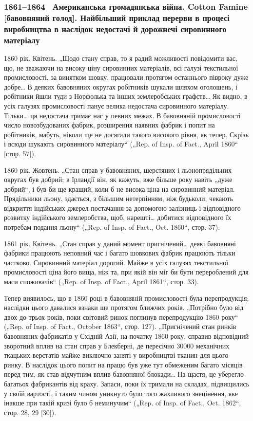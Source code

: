 
\subsubsection{1861--1864~ Американська громадянська війна. Cotton Famine [бавовняний
голод]. Найбільший приклад перерви в процесі виробництва в наслідок
недостачі й дорожнечі сировинного матеріалу}

1860 рік. Квітень. „Щодо стану справ, то я радий можливості
повідомити вас, що, не зважаючи на високу ціну сировинних
матеріалів, всі галузі текстильної промисловості, за винятком
шовку, працювали протягом останнього півроку дуже добре\dots{}
В деяких бавовняних округах робітників шукали шляхом оголошень,
і робітники йшли туди з Норфолька та інших землеробських
графств\dots{} Як видно, в усіх галузях промисловості панує велика недостача
сировинного матеріалу. Тільки\dots{} ця недостача тримає нас
у певних межах. В бавовняній промисловості число новозбудованих
фабрик, розширення наявних фабрик і попит на робітників,
мабуть, ніколи ще не досягали такого високого рівня, як
тепер. Скрізь і всюди шукають сировинного матеріалу“ („Rep.
of Insp. of Fact., April 1860“ [стор. 57]).

1860 рік. Жовтень. „Стан справ у бавовняних, шерстяних
і льонопрядільних округах був добрий; в Ірландії він, як кажуть,
вже більше року навіть „дуже добрий“, і був би ще кращий,
коли б не висока ціна на сировинний матеріал. Прядільники
льону, здається, з більшим нетерпінням, ніж будьколи,
чекають відкриття індійських джерел постачання за допомогою
залізниць і відповідного розвитку індійського землеробства, щоб,
нарешті\dots{} добитися відповідного їх потребам подання льону“
(„Rep. of Insp. of Fact., Oct. 1860“, стор. 37).

1861 рік. Квітень. „Стан справ у даний момент пригнічений\dots{}
деякі бавовняні фабрики працюють неповний час і багато шовкових
фабрик працюють тільки частково. Сировинний матеріал
дорогий. Майже в усіх галузях текстильної промисловості
ціна його вища, ніж та, при якій він міг би бути перероблений
для маси споживачів“ („Rep. of Insp. of Fact., April 1861“, стор. 33).

Тепер виявилось, що в 1860 році в бавовняній промисловості
була перепродукція; наслідки цього давалися взнаки ще протягом
ближчих років. „Потрібно було від двох до трьох років,
поки світовий ринок поглинув перепродукцію 1860 року“ („Rep.
of Insp. of Fact., October 1863“, стор. 127). „Пригнічений стан
ринків бавовняних фабрикатів у Східній Азії, на початку 1860 року,
справив відповідний зворотний вплив на стан справ у Блекберні,
де пересічно 30000 механічних ткацьких верстатів майже виключно
заняті у виробництві тканин для цього ринку. В наслідок
цього попит на працю був уже тут обмеженим багато місяців
перед тим, як став відчутним вплив бавовняної блокади\dots{}
На щастя, це уберегло багатьох фабрикантів від краху. Запаси,
поки їх тримали на складах, підвищились у своїй вартості, і таким
чином уникнуто було того жахливого знецінення, яке
інакше при такій кризі було б неминучим“ („Rep. of Insp. of
Fact., Oct. 1862“, стор. 28, 29 [30]).
